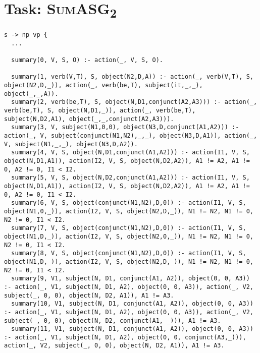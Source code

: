 \section{Task: \textsc{SumASG\textsubscript{2}}}
\label{sec:appendix_asg_2}

\begin{lstlisting}
s -> np vp {
  ...

  summary(0, V, S, O) :- action(_, V, S, O).

  summary(1, verb(V,T), S, object(N2,D,A)) :- action(_, verb(V,T), S, object(N2,D,_)), action(_, verb(be,T), subject(it,_,_), object(_,_,A)).
  summary(2, verb(be,T), S, object(N,D1,conjunct(A2,A3))) :- action(_, verb(be,T), S, object(N,D1,_)), action(_, verb(be,T), subject(N,D2,A1), object(_,_,conjunct(A2,A3))).
  summary(3, V, subject(N1,0,0), object(N3,D,conjunct(A1,A2))) :- action(_, V, subject(conjunct(N1,N2),_,_), object(N3,D,A1)), action(_, V, subject(N1,_,_), object(N3,D,A2)).
  summary(4, V, S, object(N,D1,conjunct(A1,A2))) :- action(I1, V, S, object(N,D1,A1)), action(I2, V, S, object(N,D2,A2)), A1 != A2, A1 != 0, A2 != 0, I1 < I2.
  summary(5, V, S, object(N,D2,conjunct(A1,A2))) :- action(I1, V, S, object(N,D1,A1)), action(I2, V, S, object(N,D2,A2)), A1 != A2, A1 != 0, A2 != 0, I1 < I2.
  summary(6, V, S, object(conjunct(N1,N2),D,0)) :- action(I1, V, S, object(N1,0,_)), action(I2, V, S, object(N2,D,_)), N1 != N2, N1 != 0, N2 != 0, I1 < I2.
  summary(7, V, S, object(conjunct(N1,N2),D,0)) :- action(I1, V, S, object(N1,D,_)), action(I2, V, S, object(N2,0,_)), N1 != N2, N1 != 0, N2 != 0, I1 < I2.
  summary(8, V, S, object(conjunct(N1,N2),D,0)) :- action(I1, V, S, object(N1,D,_)), action(I2, V, S, object(N2,D,_)), N1 != N2, N1 != 0, N2 != 0, I1 < I2.
  summary(9, V1, subject(N, D1, conjunct(A1, A2)), object(0, 0, A3)) :- action(_, V1, subject(N, D1, A2), object(0, 0, A3)), action(_, V2, subject(_, 0, 0), object(N, D2, A1)), A1 != A3.
  summary(10, V1, subject(N, D1, conjunct(A1, A2)), object(0, 0, A3)) :- action(_, V1, subject(N, D1, A2), object(0, 0, A3)), action(_, V2, subject(_, 0, 0), object(N, D2, conjunct(A1, _))), A1 != A3.
  summary(11, V1, subject(N, D1, conjunct(A1, A2)), object(0, 0, A3)) :- action(_, V1, subject(N, D1, A2), object(0, 0, conjunct(A3,_))), action(_, V2, subject(_, 0, 0), object(N, D2, A1)), A1 != A3.


\end{lstlisting}
